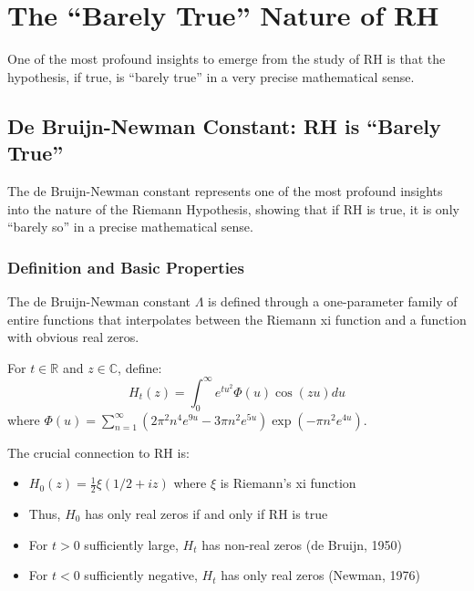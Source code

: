 \section{The ``Barely True'' Nature of RH}
\label{sec:barely_true}

One of the most profound insights to emerge from the study of RH is that the hypothesis, if true, is ``barely true'' in a very precise mathematical sense.

\subsection{De Bruijn-Newman Constant: RH is ``Barely True''}
\label{subsec:de_bruijn_newman}

The de Bruijn-Newman constant represents one of the most profound insights into the nature of the Riemann Hypothesis, showing that if RH is true, it is only ``barely so'' in a precise mathematical sense.

\subsubsection{Definition and Basic Properties}

The de Bruijn-Newman constant $\Lambda$ is defined through a one-parameter family of entire functions that interpolates between the Riemann xi function and a function with obvious real zeros.

\begin{definition}
\label{def:h_t_functions}
For $t \in \mathbb{R}$ and $z \in \mathbb{C}$, define:
\begin{equation}
H_t(z) = \int_0^\infty e^{tu^2} \Phi(u) \cos(zu) du
\end{equation}
where $\Phi(u) = \sum_{n=1}^\infty (2\pi^2 n^4 e^{9u} - 3\pi n^2 e^{5u}) \exp(-\pi n^2 e^{4u})$.
\end{definition}

The crucial connection to RH is:
\begin{itemize}
\item $H_0(z) = \frac{1}{2}\xi(1/2 + iz)$ where $\xi$ is Riemann's xi function
\item Thus, $H_0$ has only real zeros if and only if RH is true
\item For $t > 0$ sufficiently large, $H_t$ has non-real zeros (de Bruijn, 1950)
\item For $t < 0$ sufficiently negative, $H_t$ has only real zeros (Newman, 1976)
\end{itemize}

